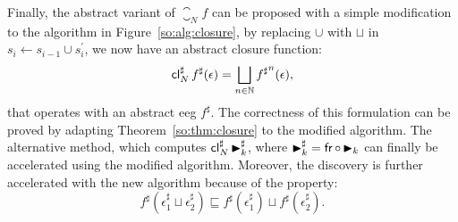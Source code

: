 Finally, the abstract variant of $\closure_N f$ can be proposed with a simple
modification to the algorithm in Figure~\ref{so:alg:closure}, by replacing
$\cup$ with $\sqcup$ in $s_i \gets s_{i-1} \cup s^\prime_i$, we now have
an abstract closure function:
\begin{equation}
    \operatorname{\mathsf{cl}}^\sharp_N f^\sharp (\epsilon)
    = \bigsqcup_{n \in \mathbb{N}} {f^\sharp}^n (\epsilon),
\end{equation}
that operates with an abstract \gls{eeg} $f^\sharp$.  The correctness of this
formulation can be proved by adapting Theorem~\ref{so:thm:closure} to the
modified algorithm.  The alternative method, \greedytrace{} which computes
$\operatorname{\mathsf{cl}}^\sharp_N \operatorname{\blacktriangleright}_k^\sharp$, where $\operatorname{\blacktriangleright}_k^\sharp = \operatorname{\mathsf{fr}} \circ
\operatorname{\blacktriangleright}_k$ can finally be accelerated using the modified algorithm.  Moreover,
the discovery is further accelerated with the new algorithm because of the
property:
\begin{equation}
    f^\sharp\left(\epsilon^\sharp_1 \sqcup \epsilon^\sharp_2\right)
    \sqsubseteq f^\sharp\left(\epsilon^\sharp_1\right)
    \sqcup f^\sharp\left(\epsilon^\sharp_2\right).
\end{equation}

